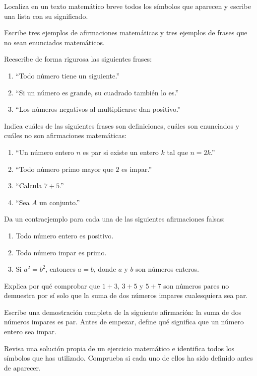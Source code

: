 \begin{ejerciciospropuestos}
  \item Localiza en un texto matemático breve todos los símbolos que aparecen y escribe una lista con su significado.

  \item Escribe tres ejemplos de afirmaciones matemáticas y tres ejemplos de frases que no sean enunciados matemáticos.

  \item Reescribe de forma rigurosa las siguientes frases:
  \begin{enumerate}
    \item ``Todo número tiene un siguiente.''
    \item ``Si un número es grande, su cuadrado también lo es.''
    \item ``Los números negativos al multiplicarse dan positivo.''
  \end{enumerate}

  \item Indica cuáles de las siguientes frases son definiciones, cuáles son enunciados y cuáles no son afirmaciones matemáticas:
  \begin{enumerate}
    \item ``Un número entero \(n\) es par si existe un entero \(k\) tal que \(n=2k\).''
    \item ``Todo número primo mayor que \(2\) es impar.''
    \item ``Calcula \(7+5\).''
    \item ``Sea \(A\) un conjunto.''
  \end{enumerate}

  \item Da un contraejemplo para cada una de las siguientes afirmaciones falsas:
  \begin{enumerate}
    \item Todo número entero es positivo.
    \item Todo número impar es primo.
    \item Si \(a^2=b^2\), entonces \(a=b\), donde \(a\) y \(b\) son números enteros.
  \end{enumerate}

  \item Explica por qué comprobar que \(1+3\), \(3+5\) y \(5+7\) son números pares no demuestra por sí solo que la suma de dos números impares cualesquiera sea par.

  \item Escribe una demostración completa de la siguiente afirmación: la suma de dos números impares es par. Antes de empezar, define qué significa que un número entero sea impar.

  \item Revisa una solución propia de un ejercicio matemático e identifica todos los símbolos que has utilizado. Comprueba si cada uno de ellos ha sido definido antes de aparecer.
\end{ejerciciospropuestos}

